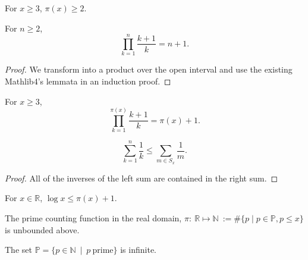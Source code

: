 \begin{lemma}
\label{lem:lemma5-2}
\leanok
For $x\ge3$, $\pi(x)\ge2$.
\end{lemma}

\begin{lemma}
\label{lem:lemma5-1}
\leanok
For $n\ge2$,
    $$\prod_{k=1}^{n}\frac{k+1}{k} = n+1.$$
\end{lemma}
\begin{proof}
\leanok
We transform into a product over the open interval and use the existing Mathlib4's lemmata in an induction proof.
\end{proof}

\begin{lemma}
\label{lem:lemma5}
\leanok
For $x\ge3$,
    $$\prod_{k=1}^{\pi(x)}\frac{k+1}{k} = \pi(x)+1.$$
\end{lemma}

\begin{lemma}
\label{lem:lemma1}
\leanok
    $$\sum_{k=1}^n\frac1k \le \sum_{m\in S_x}\frac{1}{m}. $$
\end{lemma}
\begin{proof}
All of the inverses of the left sum are contained in the right sum.
\end{proof}


\begin{theorem}
\label{thm:log_le_primeCountingReal_add_one}
\leanok
For $x\in\mathbb{R}$, $\log x \le \pi(x) +1$.
\end{theorem}

\begin{theorem}
\label{thm:primeCountingReal_unbounded}
\leanok
The prime counting function in the real domain, $\pi:\ \mathbb{R} \mapsto \mathbb{N} \ := \#\big\{p\mid p \in\mathbb{P}, p\le x \big\}$ is unbounded above.
\end{theorem}

\begin{theorem}
\label{thm:infinite_primes}
\leanok
{}
The set $\mathbb{P} = \big\{p \in \mathbb{N} \ \mid \ p \ \mathrm{prime} \big\}$ is infinite. 
\end{theorem}


